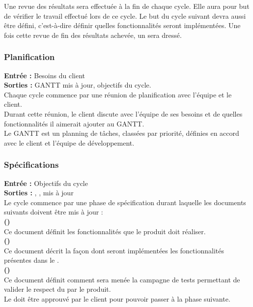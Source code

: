 Une revue des résultats sera effectuée à la fin de chaque cycle. Elle aura pour but de vérifier le travail effectué lors de ce cycle. Le but du cycle suivant devra aussi être défini, c’est-à-dire définir quelles fonctionnalités seront implémentées. Une fois cette revue de fin des résultats achevée, un \PV{} sera dressé.



\subsubsection{Planification}

\textbf{Entrée :} Besoins du client \\
\textbf{Sorties :} GANTT mis à jour, objectifs du cycle.\\
Chaque cycle commence par une réunion de planification avec l’équipe et le client. \\
Durant cette réunion, le client discute avec l’équipe de ses besoins et de quelles fonctionnalités il aimerait ajouter au GANTT. \\
Le GANTT est un planning de tâches, classées par priorité, définies en accord avec le client et l'équipe de développement.
\subsubsection{Spécifications}
\label{specification}
\textbf{Entrée :} Objectifs du cycle \\
\textbf{Sorties :} \DSECourt , \DSICourt , \PTVCourt{} mis à jour \\
Le cycle commence par une phase de spécification durant laquelle les documents suivants doivent être mis à jour : \\

\textbf{\DSE (\DSECourt)} \\
Ce document définit les fonctionnalités que le produit doit réaliser.\\

\textbf{\DSI (\DSICourt)} \\
Ce document décrit la façon dont seront implémentées les fonctionnalités présentes dans le \DSECourt.\\

\textbf{\PTV (\PTVCourt)} \\
Ce document définit comment sera menée la campagne de tests permettant de valider le respect du \DSECourt{} par le produit. \\

Le \DSECourt{} doit être approuvé par le client pour pouvoir passer à la phase suivante. \\


